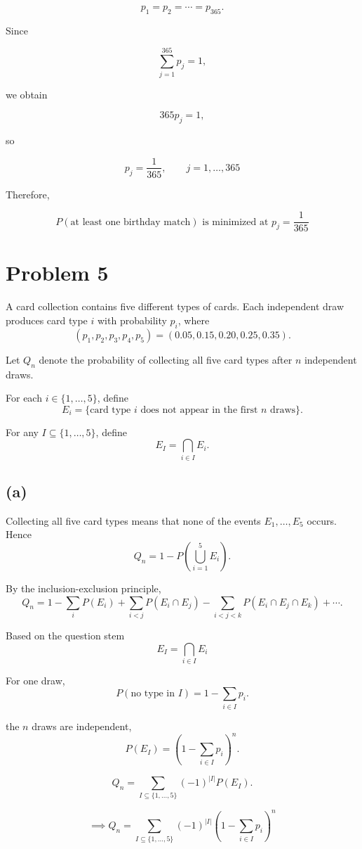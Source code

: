 \documentclass{article}
\begin{document}
\[
p_1=p_2=\cdots=p_{365}.
\]

Since

\[
\sum_{j=1}^{365}p_j=1,
\]

we obtain

\[
365p_j=1,
\]

so

\[
p_j=\frac1{365},
\qquad
j=1,\ldots,365
\]

Therefore,

\[
P(\text{at least one birthday match})
\text{ is minimized at }
p_j=\frac1{365}
\]





\section*{Problem 5}

A card collection contains five different types of cards. Each independent draw
produces card type $i$ with probability $p_i$, where
\[
(p_1,p_2,p_3,p_4,p_5)
=
(0.05,0.15,0.20,0.25,0.35).
\]

Let $Q_n$ denote the probability of collecting all five card types after $n$
independent draws.

For each $i\in\{1,\ldots,5\}$, define
\[
E_i
=
\{\text{card type $i$ does not appear in the first $n$ draws}\}.
\]

For any $I\subseteq\{1,\ldots,5\}$, define
\[
E_I=\bigcap_{i\in I}E_i.
\]

\subsection*{(a)}

Collecting all five card types means that none of the events
$E_1,\ldots,E_5$ occurs. Hence
\[
Q_n
=
1-
P\left(\bigcup_{i=1}^{5}E_i\right).
\]

By the inclusion-exclusion principle,
\[
Q_n
=
1
-\sum_{i}P(E_i)
+\sum_{i<j}P(E_i\cap E_j)
-\sum_{i<j<k}P(E_i\cap E_j\cap E_k)
+\cdots.
\]

Based on the question stem
\[
E_I=\bigcap_{i\in I}E_i
\]

For one draw,
\[
P(\text{no type in }I)
=
1-\sum_{i\in I}p_i.
\]

the $n$ draws are independent,
\[
P(E_I)
=
\left(
1-\sum_{i\in I}p_i
\right)^n.
\]


\[
Q_n
=
\sum_{I\subseteq\{1,\ldots,5\}}
(-1)^{|I|}
P(E_I).
\]

\[
\implies
Q_n
=
\sum_{I\subseteq\{1,\ldots,5\}}
(-1)^{|I|}
\left(
1-\sum_{i\in I}p_i
\right)^n
\]
\end{document}
